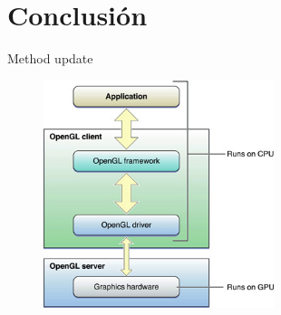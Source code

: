 \documentclass{beamer}
\begin{document}
\section{Conclusión}
\begin{frame}{Method update}
  \begin{figure}[h]
    \centering
    \includegraphics[width=0.6\textwidth]{img/cpu_gpu}
  \end{figure}

\end{frame}
\end{document}
